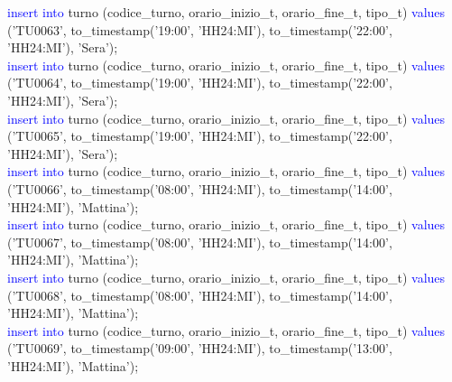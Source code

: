 \documentclass{article}
\begin{document}
\begin{flushleft}
{        \hspace*{0.5em}\textcolor{blue}{insert into} turno (codice\_turno, orario\_inizio\_t, orario\_fine\_t, tipo\_t) \textcolor{blue}{values} \hspace*{0.5em}('TU0063', to\_timestamp('19:00', 'HH24:MI'), to\_timestamp('22:00', 'HH24:MI'), \hspace*{0.5em}'Sera'); \\
        \hspace*{0.5em}\textcolor{blue}{insert into} turno (codice\_turno, orario\_inizio\_t, orario\_fine\_t, tipo\_t) \textcolor{blue}{values} \hspace*{0.5em}('TU0064', to\_timestamp('19:00', 'HH24:MI'), to\_timestamp('22:00', 'HH24:MI'), \hspace*{0.5em}'Sera'); \\
        \hspace*{0.5em}\textcolor{blue}{insert into} turno (codice\_turno, orario\_inizio\_t, orario\_fine\_t, tipo\_t) \textcolor{blue}{values} \hspace*{0.5em}('TU0065', to\_timestamp('19:00', 'HH24:MI'), to\_timestamp('22:00', 'HH24:MI'), \hspace*{0.5em}'Sera'); \\
        \hspace*{0.5em}\textcolor{blue}{insert into} turno (codice\_turno, orario\_inizio\_t, orario\_fine\_t, tipo\_t) \textcolor{blue}{values} \hspace*{0.5em}('TU0066', to\_timestamp('08:00', 'HH24:MI'), to\_timestamp('14:00', 'HH24:MI'), \hspace*{0.5em}'Mattina'); \\
        \hspace*{0.5em}\textcolor{blue}{insert into} turno (codice\_turno, orario\_inizio\_t, orario\_fine\_t, tipo\_t) \textcolor{blue}{values} \hspace*{0.5em}('TU0067', to\_timestamp('08:00', 'HH24:MI'), to\_timestamp('14:00', 'HH24:MI'), \hspace*{0.5em}'Mattina'); \\
        \hspace*{0.5em}\textcolor{blue}{insert into} turno (codice\_turno, orario\_inizio\_t, orario\_fine\_t, tipo\_t) \textcolor{blue}{values} \hspace*{0.5em}('TU0068', to\_timestamp('08:00', 'HH24:MI'), to\_timestamp('14:00', 'HH24:MI'), \hspace*{0.5em}'Mattina'); \\
        \hspace*{0.5em}\textcolor{blue}{insert into} turno (codice\_turno, orario\_inizio\_t, orario\_fine\_t, tipo\_t) \textcolor{blue}{values} \hspace*{0.5em}('TU0069', to\_timestamp('09:00', 'HH24:MI'), to\_timestamp('13:00', 'HH24:MI'), \hspace*{0.5em}'Mattina'); \\
}
\end{flushleft}
\end{document}
